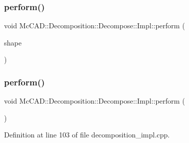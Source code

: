 \subsubsection{\texorpdfstring{perform()}{perform()}\hspace{0.1cm}{\footnotesize\ttfamily [2/4]}}
{\footnotesize\ttfamily void Mc\+C\+A\+D\+::\+Decomposition\+::\+Decompose\+::\+Impl\+::perform (\begin{DoxyParamCaption}\item[{const Topo\+D\+S\+\_\+\+Shape \&}]{shape }\end{DoxyParamCaption})}

\mbox{\label{classMcCAD_1_1Decomposition_1_1Decompose_1_1Impl_a71700a5c5ec1eaa1b414cb232d1a073b}} 
\subsubsection{\texorpdfstring{perform()}{perform()}\hspace{0.1cm}{\footnotesize\ttfamily [3/4]}}
{\footnotesize\ttfamily void Mc\+C\+A\+D\+::\+Decomposition\+::\+Decompose\+::\+Impl\+::perform (\begin{DoxyParamCaption}{ }\end{DoxyParamCaption})}



Definition at line 103 of file decomposition\+\_\+impl.\+cpp.


